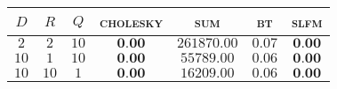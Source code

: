 
\begin{tabular}{ccccccc}
  \toprule

  $D$ & $R$ & $Q$ & \textsc{cholesky} & \textsc{sum} & \textsc{bt} & \textsc{slfm}\\\midrule
 $ 2 $ & $ 2 $ & $ 10 $ & $ \textbf{0.00} $ & $ 261870.00 $ & $ 0.07 $ & $ \textbf{0.00} $ \\ 
 $ 10 $ & $ 1 $ & $ 10 $ & $ \textbf{0.00} $ & $ 55789.00 $ & $ 0.06 $ & $ \textbf{0.00} $ \\ 
 $ 10 $ & $ 10 $ & $ 1 $ & $ \textbf{0.00} $ & $ 16209.00 $ & $ 0.06 $ & $ \textbf{0.00} $ \\ 
 \bottomrule 
 \end{tabular}